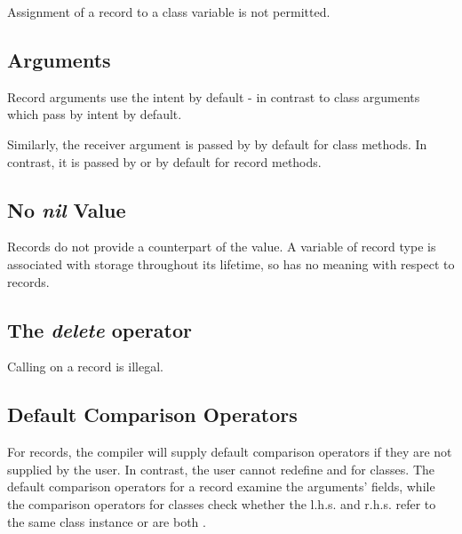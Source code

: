 Assignment of a record to a class variable is not permitted.

\subsection{Arguments}
\label{Argument_Differences}

Record arguments use the  intent by default - in contrast
to class arguments which pass by  intent by default.

Similarly, the  receiver argument is passed by  by
default for class methods. In contrast, it is passed by  or
 by default for record methods.

\subsection{No {\em nil} Value}

Records do not provide a counterpart of the  value.  A variable of
record type is associated with storage throughout its lifetime, so 
has no meaning with respect to records.

\subsection{The {\em delete} operator}
\label{Record_Delete_Illegal}

Calling  on a record is illegal.


\subsection{Default Comparison Operators}
\label{Comparison_Operator_Differences}

For records, the compiler will supply default comparison operators if
they are not supplied by the user.  In contrast, the user cannot redefine
\chpl{==} and \chpl{!=} for classes.  The default comparison operators
for a record examine the arguments' fields, while the comparison
operators for classes check whether the l.h.s. and r.h.s. refer to the
same class instance or are both .
